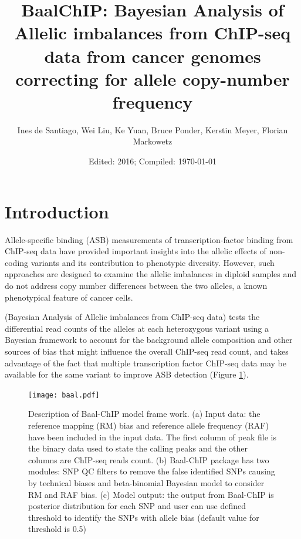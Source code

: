 \documentclass{article}\usepackage[]{graphicx}\usepackage[usenames,dvipsnames]{color}
\begin{document}
\title{BaalChIP: Bayesian Analysis of Allelic imbalances from ChIP-seq data from cancer genomes correcting for allele copy-number frequency}
\author{Ines de Santiago, Wei Liu, Ke Yuan, Bruce Ponder, Kerstin Meyer, Florian Markowetz}

\date{Edited: 2016; Compiled: \today}

\maketitle

\tableofcontents

\section{Introduction}

Allele-specific binding (ASB) measurements of transcription-factor binding from ChIP-seq data have provided important insights into the allelic effects of non-coding variants and its contribution to phenotypic diversity. However, such approaches are designed to examine the allelic imbalances in diploid samples and do not address copy number differences between the two alleles, a known phenotypical feature of cancer cells.

 (Bayesian Analysis of Allelic imbalances from ChIP-seq data) tests the differential read counts of the alleles at each heterozygous variant using a Bayesian framework to account for the background allele composition and other sources of bias that might influence the overall ChIP-seq read count, and takes advantage of the fact that multiple transcription factor ChIP-seq data may be available for the same variant to improve ASB detection (Figure \ref{fig:baalFramewor}).

\begin{center}
\begin{figure}[H]
\texttt{[image: baal.pdf]}
\caption{Description of Baal-ChIP model frame work. (a) Input data: the reference mapping (RM) bias and reference allele frequency (RAF) have been included in the input data. The first column of peak file is the binary data used to state the calling peaks and the other columns are ChIP-seq reads count. (b) Baal-ChIP package has two modules: SNP QC filters to remove the false identified SNPs causing by technical biases and beta-binomial Bayesian model to consider RM and RAF bias. (c) Model output: the output from Baal-ChIP is posterior distribution for each SNP and user can use defined threshold to identify the SNPs with allele bias (default value for threshold is 0.5)}
\label{fig:baalFramewor}
\end{figure}
\end{center}
\end{document}
